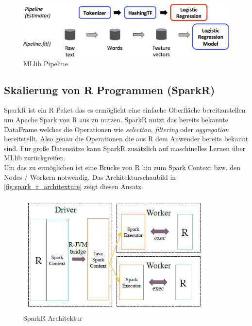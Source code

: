 \begin{figure}[h]
  \centering
  \includegraphics[width=\textwidth]{./bilder/ml-pipeline.png}
  \caption{MLlib Pipeline \cite{SPMLLIB}}\label{fig:spark_ml_pipeline}
\end{figure}






\newpage
\subsection{Skalierung von R Programmen (SparkR)}\label{sec_sparkr}

SparkR ist ein R Paket das es ermöglicht eine einfache Oberfläche bereitzustellen um Apache Spark von R aus zu nutzen. SparkR nutzt das bereits bekannte DataFrame welches die Operationen wie \textsl{selection}, \textsl{filtering} oder \textsl{aggregation} bereitstellt. Also genau die Operationen die aus R dem Anwender bereits bekannt sind. 
Für große Datensätze kann SparkR zusätzlich auf maschinelles Lernen über MLlib zurückgreifen. \\

\noindent
Um das zu ermöglichen ist eine Brücke von R hin zum Spark Context bzw. den Nodes / Workern notwendig. Das Architekturschaubild in \autoref{fig:spark_r_architexture} zeigt diesen Ansatz. 
\begin{figure}[h]
  \centering
  \includegraphics[width=100mm]{./bilder/spark_r_architecture.PNG}
  \caption{SparkR Architektur \cite{VYL+16}}\label{fig:spark_r_architexture}
\end{figure}


